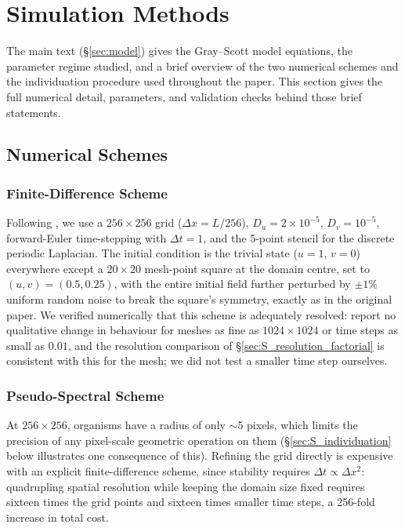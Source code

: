 \documentclass[11pt]{article}
\begin{document}
\section{Simulation Methods}
\label{sec:S_model}

The main text (\S\ref{sec:model}) gives the Gray--Scott model equations, the parameter regime studied, and a brief overview of the two numerical schemes and the individuation procedure used throughout the paper. This section gives the full numerical detail, parameters, and validation checks behind those brief statements.

\subsection{Numerical Schemes}
\label{sec:S_schemes}

\subsubsection{Finite-Difference Scheme}

Following \citet{Pearson1993}, we use a $256\times256$ grid ($\Delta x = L/256$), $D_u = 2\times10^{-5}$, $D_v = 10^{-5}$, forward-Euler time-stepping with $\Delta t = 1$, and the 5-point stencil for the discrete periodic Laplacian. The initial condition is the trivial state ($u=1$, $v=0$) everywhere except a $20\times20$ mesh-point square at the domain centre, set to $(u,v) = (0.5, 0.25)$, with the entire initial field further perturbed by $\pm1\%$ uniform random noise to break the square's symmetry, exactly as in the original paper. We verified numerically that this scheme is adequately resolved: \citet{Pearson1993} report no qualitative change in behaviour for meshes as fine as $1024\times1024$ or time steps as small as $0.01$, and the resolution comparison of \S\ref{sec:S_resolution_factorial} is consistent with this for the mesh; we did not test a smaller time step ourselves.

\subsubsection{Pseudo-Spectral Scheme}
\label{sec:S_pseudospectral}

At $256\times256$, organisms have a radius of only $\sim$5 pixels, which limits the precision of any pixel-scale geometric operation on them (\S\ref{sec:S_individuation} below illustrates one consequence of this). Refining the grid directly is expensive with an explicit finite-difference scheme, since stability requires $\Delta t \propto \Delta x^2$: quadrupling spatial resolution while keeping the domain size fixed requires sixteen times the grid points and sixteen times smaller time steps, a 256-fold increase in total cost.
\end{document}
